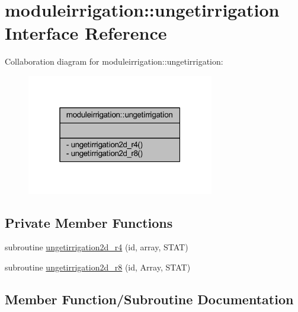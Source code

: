 \hypertarget{interfacemoduleirrigation_1_1ungetirrigation}{}\section{moduleirrigation\+:\+:ungetirrigation Interface Reference}
\label{interfacemoduleirrigation_1_1ungetirrigation}


Collaboration diagram for moduleirrigation\+:\+:ungetirrigation\+:\nopagebreak
\begin{figure}[H]
\begin{center}
\leavevmode
\includegraphics[width=232pt]{interfacemoduleirrigation_1_1ungetirrigation__coll__graph}
\end{center}
\end{figure}
\subsection*{Private Member Functions}
\begin{DoxyCompactItemize}
\item 
subroutine \mbox{\hyperlink{interfacemoduleirrigation_1_1ungetirrigation_a09242bb3893ae04d59c6c17d63ef4251}{ungetirrigation2d\+\_\+r4}} (id, array, S\+T\+AT)
\item 
subroutine \mbox{\hyperlink{interfacemoduleirrigation_1_1ungetirrigation_a19e38a67e8ac04735c0eb684e7d63dcf}{ungetirrigation2d\+\_\+r8}} (id, Array, S\+T\+AT)
\end{DoxyCompactItemize}


\subsection{Member Function/\+Subroutine Documentation}
\mbox{\label{interfacemoduleirrigation_1_1ungetirrigation_a09242bb3893ae04d59c6c17d63ef4251}} 
